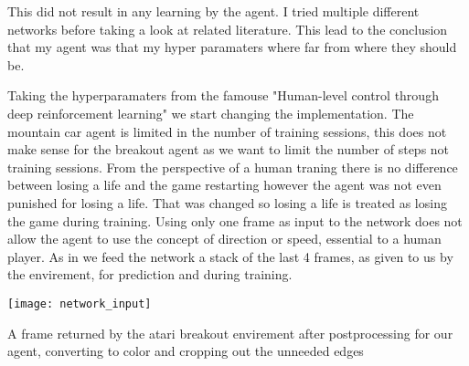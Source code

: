 This did not result in any learning by the agent. I tried multiple different networks before taking a look at related literature\cite{atari}. This lead to the conclusion that my agent was that my hyper paramaters where far from where they should be.

Taking the hyperparamaters from the famouse "Human-level control through deep reinforcement learning"\cite{DQN} we start changing the implementation. The mountain car agent is limited in the number of training sessions, this does not make sense for the breakout agent as we want to limit the number of steps not training sessions. From the perspective of a human traning there is no difference between losing a life and the game restarting however the agent was not even punished for losing a life. That was changed so losing a life is treated as losing the game during training.
Using only one frame as input to the network does not allow the agent to use the concept of direction or speed, essential to a human player. As in\cite{DQN} we feed the network a stack of the last 4 frames, as given to us by the envirement, for prediction and during training. 

\begin{marginfigure}
    \texttt{[image: network\_input]}
    \caption{A frame returned by the atari breakout envirement after postprocessing for our agent, converting to color and cropping out the unneeded edges}
    \label{fig:breakout_postprocess}
\end{marginfigure}

